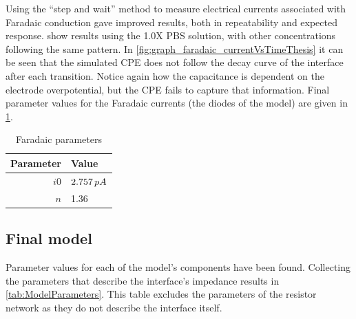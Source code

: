         Using the ``step and wait'' method to measure electrical currents associated with Faradaic conduction gave improved results, both in repeatability and expected response.
         show results using the 1.0X PBS solution, with other concentrations following the same pattern.
        In \cref{fig:graph_faradaic_currentVsTimeThesis} it can be seen that the simulated CPE does not follow the decay curve of the interface after each transition.
        Notice again how the capacitance is dependent on the electrode overpotential, but the CPE fails to capture that information.
        Final parameter values for the Faradaic currents (the diodes of the model) are given in \cref{tab:FaradaicParams}.

        \begin{table}
          \caption{Faradaic parameters}
          \label{tab:FaradaicParams}
          \begin{center}
            \begin{tabular}{r | l}
                Parameter & Value \\
                \hline
                $i0$ & $2.757\thinspace pA$\\
                $n$ & 1.36\\
            \end{tabular}
          \end{center}
        \end{table}


    \subsection{Final model}


      Parameter values for each of the model's components have been found.
      Collecting the parameters that describe the interface's impedance results in \cref{tab:ModelParameters}.
      This table excludes the parameters of the resistor network as they do not describe the interface itself.

